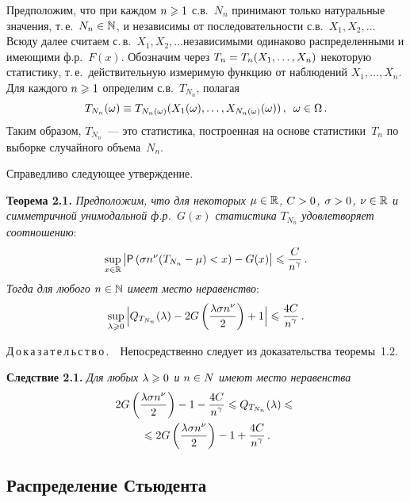 \begin{multicols}{2}
Предположим, что при каждом  $n\hm\geqslant 1$ с.в.~$N_n$ принимают только
натуральные значения, т.\,е.\ $N_n\hm\in \N$, и независимы от
последовательности с.в.\ $X_1, X_2, \ldots$ Всюду далее считаем с.\,в.\
$X_1, X_2, \ldots$\linebreak  независимыми одинаково распределенными и\linebreak
имеющими ф.р.~$F(x)$. Обозначим через  $T_n\hm=T_n(X_1,\ldots,X_n)$
некоторую статистику, т.\,е.\ действительную измеримую функцию от
наблюдений $X_1,\ldots,X_n$. Для каждого $n\hm\geqslant1$  определим с.в.\
$T_{N_n}$, полагая
$$
T_{N_n}(\omega)\equiv
T_{N_n(\omega)}(X_1(\omega),\ldots,X_{N_n(\omega)}(\omega))\,,\enskip
\omega\in\Omega\,.
$$
Таким образом,  $T_{N_n}$~--- это статистика, построенная на основе
статистики~$T_n$ по выборке случайного объема~$N_n$.

Справедливо следующее утверждение.

\smallskip

\noindent
\textbf{Теорема 2.1.} \textit{Предположим, что для некоторых $\mu\hm\in\r$,
$C\hm>0$, $\sigma\hm>0$, $\nu\hm\in\r$ и симметричной унимодальной ф.р.~$G(x)$ 
статистика $T_{N_n}$ удовлетворяет соотношению}:
$$
\sup\limits_{x\in\mathbb{R}}\big|{\sf P}\left(\sigma n^{\nu}(T_{N_n}-\mu)<x\right)-
G(x)\big|\leqslant \displaystyle\frac{\displaystyle C\mathstrut}{\displaystyle n^{\gamma}\mathstrut}\,.
$$
\textit{Тогда для любого $n\in\mathbb N$ имеет место
неравенство}:
$$
\sup\limits_{\lambda\geqslant0}\Big|Q_{T_{N_n}}(\lambda)-
2G\left(\displaystyle\frac{\displaystyle \lambda\sigma n^{\nu}\mathstrut}{\displaystyle 2\mathstrut}\right)+1\Big|\leqslant
\displaystyle\frac{\displaystyle 4C\mathstrut}{\displaystyle n^{\gamma}\mathstrut}\,.
$$

\smallskip

\noindent
Д\,о\,к\,а\,з\,а\,т\,е\,л\,ь\,с\,т\,в\,о\,.\ \  Непосредственно следует из доказательства
теоремы~1.2.

\smallskip

\noindent
\textbf{Следствие 2.1.} \textit{Для любых $\lambda\hm\geqslant0$ и $n\hm\in N$ имеют место
неравенства}
\begin{multline*}
2G\left(\displaystyle\frac{\displaystyle \lambda\sigma n^\nu\mathstrut}{\displaystyle 2\mathstrut}\right)-1-\displaystyle\frac{\displaystyle 4C\mathstrut}{\displaystyle n^\gamma\mathstrut} \leqslant
Q_{T_{N_n}}(\lambda)\leqslant{}\\
{}\leqslant 2G\left(\displaystyle\frac{\displaystyle \lambda\sigma n^\nu\mathstrut}{\displaystyle 2\mathstrut}\right)
-1+\displaystyle\frac{\displaystyle 4C\mathstrut}{\displaystyle n^\gamma\mathstrut}\,.
\end{multline*}

\subsection{Распределение Стьюдента}


\end{multicols}

